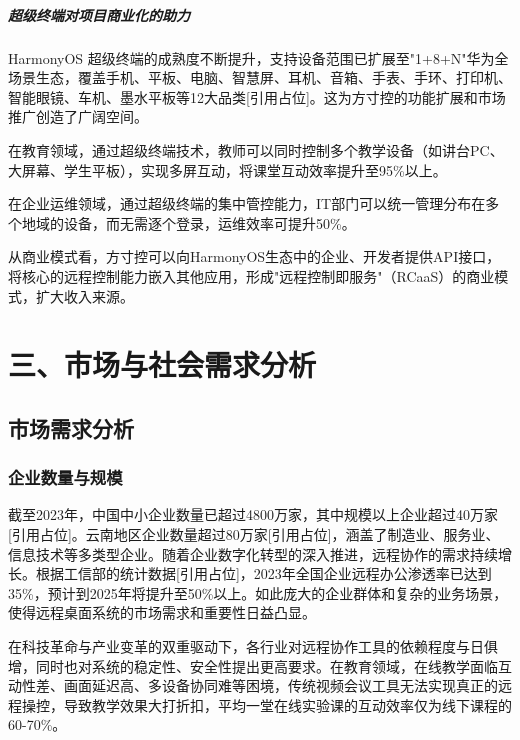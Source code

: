 \documentclass[12pt,a4paper]{article}
\renewcommand{\cite}[1]{[引用占位]}
\begin{document}
\subparagraph{超级终端对项目商业化的助力}

HarmonyOS 超级终端的成熟度不断提升，支持设备范围已扩展至"1+8+N"华为全场景生态，覆盖手机、平板、电脑、智慧屏、耳机、音箱、手表、手环、打印机、智能眼镜、车机、墨水平板等12大品类\cite{huawei2026freestream}。这为方寸控的功能扩展和市场推广创造了广阔空间。

在教育领域，通过超级终端技术，教师可以同时控制多个教学设备（如讲台PC、大屏幕、学生平板），实现多屏互动，将课堂互动效率提升至95\%以上。

在企业运维领域，通过超级终端的集中管控能力，IT部门可以统一管理分布在多个地域的设备，而无需逐个登录，运维效率可提升50\%。

从商业模式看，方寸控可以向HarmonyOS生态中的企业、开发者提供API接口，将核心的远程控制能力嵌入其他应用，形成"远程控制即服务"（RCaaS）的商业模式，扩大收入来源。

\section{三、市场与社会需求分析}

\subsection{市场需求分析}

\subsubsection{企业数量与规模}

截至2023年，中国中小企业数量已超过4800万家，其中规模以上企业超过40万家\cite{miit2023smes}。云南地区企业数量超过80万家\cite{yunnan2023stats}，涵盖了制造业、服务业、信息技术等多类型企业。随着企业数字化转型的深入推进，远程协作的需求持续增长。根据工信部的统计数据\cite{miit2023remotework}，2023年全国企业远程办公渗透率已达到35\%，预计到2025年将提升至50\%以上。如此庞大的企业群体和复杂的业务场景，使得远程桌面系统的市场需求和重要性日益凸显。

在科技革命与产业变革的双重驱动下，各行业对远程协作工具的依赖程度与日俱增，同时也对系统的稳定性、安全性提出更高要求。在教育领域，在线教学面临互动性差、画面延迟高、多设备协同难等困境，传统视频会议工具无法实现真正的远程操控，导致教学效果大打折扣，平均一堂在线实验课的互动效率仅为线下课程的60-70\%。
\end{document}
